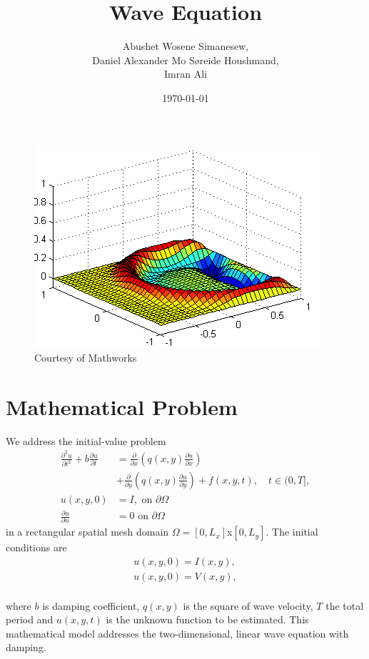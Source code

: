 \documentclass[twoside]{article}
\begin{document}
\title{Wave Equation}
\author{Abushet Wosene Simanesew,\\ Daniel Alexander Mo S\o reide Houshmand,\\ Imran Ali}
\date{\today}
\maketitle
\begin{figure} [h]
\includegraphics[scale=0.96]{WaveEquation.png}
\caption[A Pretty Wave]{Courtesy of Mathworks}
\end{figure}

\newpage
\tableofcontents

\section{Mathematical Problem}
\label{math:problem}

We address the initial-value problem
\begin{align}
\frac{\partial^2u}{\partial t^2} +b\frac{\partial u}{\partial t}  &= \frac{\partial}{\partial x}\left(q(x,y)\frac{\partial u}{\partial x} \right) \\
			  &+\frac{\partial}{\partial y}\left(q(x,y)\frac{\partial u}{\partial y} \right)
		          + f(x,y,t), \quad t \in (0,T], \label{ode} \\
		u(x,y,0)  &= I, \label{initial:value}  \text{ on } \partial \Omega \\
		 \frac{\partial u}{\partial n} &= 0 \text{ on } \partial \Omega \label{eqn:boundaries}
\end{align}
in a rectangular spatial mesh domain $\Omega = [0, L_x]$x$[0, L_y]$. The initial conditions are
\begin{align}
u(x,y,0)=I(x,y),\label{eqn:initial1}\\
u(x,y,0) =V(x,y),  \label{eqn:initial2}
\end{align} \\
where $b$ is damping coefficient, $q(x,y)$ is the square of wave velocity, $T$ the total period and $u(x,y,t)$ is the unknown function to be estimated. This mathematical model addresses the two-dimensional, linear wave equation with damping.
\end{document}
